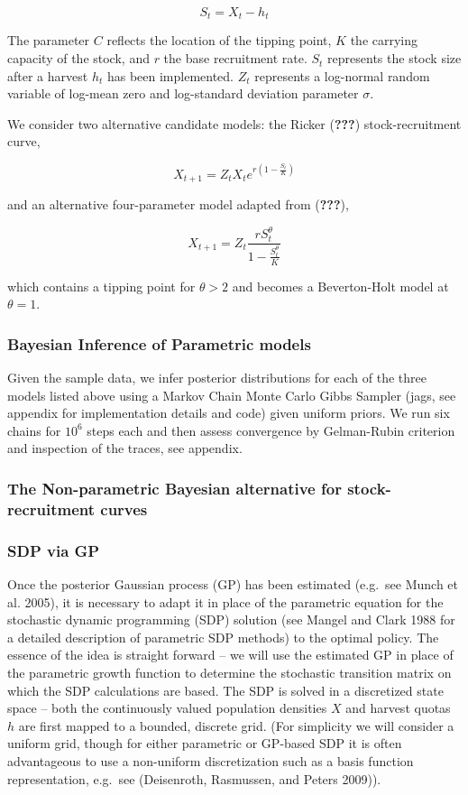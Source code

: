 \documentclass[author-year, review]{elsarticle} %
\begin{document}
\[ S_t = X_t - h_t \]

The parameter $C$ reflects the location of the tipping point, $K$ the
carrying capacity of the stock, and $r$ the base recruitment rate. $S_t$
represents the stock size after a harvest $h_t$ has been implemented.
$Z_t$ represents a log-normal random variable of log-mean zero and
log-standard deviation parameter $\sigma$.

We consider two alternative candidate models: the Ricker
({\textbf{???}}) stock-recruitment curve,

\[X_{t+1} = Z_t X_t e^{r \left(1 - \frac{S_t}{K} \right) } \]

and an alternative four-parameter model adapted from ({\textbf{???}}),

\[ X_{t+1} = Z_t \frac{r S_t^{\theta}}{1 - \frac{S_t^\theta}{K}} \]

which contains a tipping point for $\theta > 2$ and becomes a
Beverton-Holt model at $\theta = 1$.

\subsubsection{Bayesian Inference of Parametric
models}\label{bayesian-inference-of-parametric-models}

Given the sample data, we infer posterior distributions for each of the
three models listed above using a Markov Chain Monte Carlo Gibbs Sampler
(jags, see appendix for implementation details and code) given uniform
priors. We run six chains for $10^6$ steps each and then assess
convergence by Gelman-Rubin criterion and inspection of the traces, see
appendix.

\subsubsection{The Non-parametric Bayesian alternative for
stock-recruitment
curves}\label{the-non-parametric-bayesian-alternative-for-stock-recruitment-curves}

\subsubsection{SDP via GP}\label{sdp-via-gp}

Once the posterior Gaussian process (GP) has been estimated (e.g.~see
Munch et al. 2005), it is necessary to adapt it in place of the
parametric equation for the stochastic dynamic programming (SDP)
solution (see Mangel and Clark 1988 for a detailed description of
parametric SDP methods) to the optimal policy. The essence of the idea
is straight forward -- we will use the estimated GP in place of the
parametric growth function to determine the stochastic transition matrix
on which the SDP calculations are based. The SDP is solved in a
discretized state space -- both the continuously valued population
densities $X$ and harvest quotas $h$ are first mapped to a bounded,
discrete grid. (For simplicity we will consider a uniform grid, though
for either parametric or GP-based SDP it is often advantageous to use a
non-uniform discretization such as a basis function representation,
e.g.~see (Deisenroth, Rasmussen, and Peters 2009)).
\end{document}
